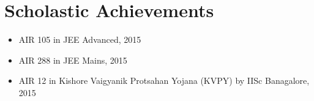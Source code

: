 \section*{Scholastic Achievements}
\begin{itemize}
\item AIR 105 in JEE Advanced, 2015
\item AIR 288 in JEE Mains, 2015
\item AIR 12 in Kishore Vaigyanik Protsahan Yojana (KVPY) by IISc Banagalore, 2015
\end{itemize}